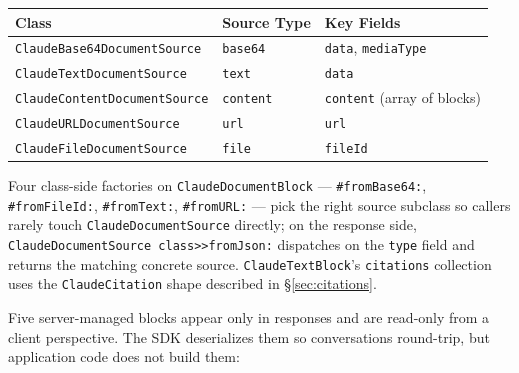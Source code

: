 \documentclass[a4paper,10pt,fleqn]{article}
\newcommand{\cls}[1]{\texttt{#1}}
\newcommand{\sel}[1]{\texttt{\##1}}
\begin{document}
\begin{center}
\small
\begin{tabular}{@{}llp{5cm}@{}}
\toprule
\textbf{Class} & \textbf{Source Type} & \textbf{Key Fields} \\
\midrule
\cls{ClaudeBase64DocumentSource}  & \texttt{base64}  & \texttt{data}, \texttt{mediaType} \\
\cls{ClaudeTextDocumentSource}    & \texttt{text}    & \texttt{data} \\
\cls{ClaudeContentDocumentSource} & \texttt{content} & \texttt{content} (array of blocks) \\
\cls{ClaudeURLDocumentSource}     & \texttt{url}     & \texttt{url} \\
\cls{ClaudeFileDocumentSource}    & \texttt{file}    & \texttt{fileId} \\
\bottomrule
\end{tabular}
\end{center}

\begin{sloppypar}
Four class-side factories on \cls{ClaudeDocumentBlock} ---
\sel{fromBase64:}, \sel{fromFileId:}, \sel{fromText:},
\sel{fromURL:} --- pick the right source subclass so callers
rarely touch \cls{ClaudeDocumentSource} directly; on the
response side, \texttt{ClaudeDocumentSource class>>fromJson:}
dispatches on the \texttt{type} field and returns the matching
concrete source.  \cls{ClaudeTextBlock}'s \texttt{citations}
collection uses the \cls{ClaudeCitation} shape described in
\S\ref{sec:citations}.
\end{sloppypar}

Five server-managed blocks appear only in responses and are
read-only from a client perspective.  The SDK deserializes them
so conversations round-trip, but application code does not
build them:
\end{document}
